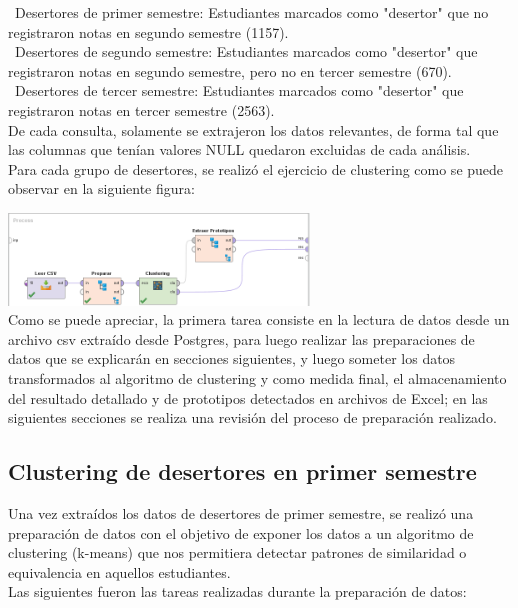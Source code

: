 \documentclass[fleqn,10pt]{SelfArx} %
\begin{document}
\textbullet\ Desertores de primer semestre: Estudiantes marcados como "desertor" que no registraron notas en segundo semestre (1157).\\
\textbullet\ Desertores de segundo semestre: Estudiantes marcados como "desertor" que registraron notas en segundo semestre, pero no en tercer semestre (670).\\
\textbullet\ Desertores de tercer semestre: Estudiantes marcados como "desertor" que registraron notas en tercer semestre (2563).\\

De cada consulta, solamente se extrajeron los datos relevantes, de forma tal que las columnas que tenían valores NULL quedaron excluidas de cada análisis.\\

Para cada grupo de desertores, se realizó el ejercicio de clustering como se puede observar en la siguiente figura:

\includegraphics[width=8cm]{img/proc.png}\\ 

Como se puede apreciar, la primera tarea consiste en la lectura de datos desde un archivo csv extraído desde Postgres, para luego realizar las preparaciones de datos que se explicarán en secciones siguientes, y luego someter los datos transformados al algoritmo de clustering y como medida final, el almacenamiento del resultado detallado y de prototipos detectados en archivos de Excel; en las siguientes secciones se realiza una revisión del proceso de preparación realizado.

\subsection{Clustering de desertores en primer semestre}

Una vez extraídos los datos de desertores de primer semestre, se realizó una preparación de datos con el objetivo de exponer los datos a un algoritmo de clustering (k-means) que nos permitiera detectar patrones de similaridad o equivalencia en aquellos estudiantes.\\

Las siguientes fueron las tareas realizadas durante la preparación de datos:\\
\end{document}
